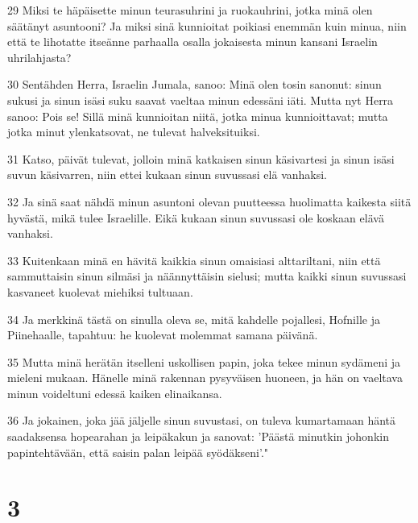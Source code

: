 \par 29 Miksi te häpäisette minun teurasuhrini ja ruokauhrini, jotka minä olen säätänyt asuntooni? Ja miksi sinä kunnioitat poikiasi enemmän kuin minua, niin että te lihotatte itseänne parhaalla osalla jokaisesta minun kansani Israelin uhrilahjasta?
\par 30 Sentähden Herra, Israelin Jumala, sanoo: Minä olen tosin sanonut: sinun sukusi ja sinun isäsi suku saavat vaeltaa minun edessäni iäti. Mutta nyt Herra sanoo: Pois se! Sillä minä kunnioitan niitä, jotka minua kunnioittavat; mutta jotka minut ylenkatsovat, ne tulevat halveksituiksi.
\par 31 Katso, päivät tulevat, jolloin minä katkaisen sinun käsivartesi ja sinun isäsi suvun käsivarren, niin ettei kukaan sinun suvussasi elä vanhaksi.
\par 32 Ja sinä saat nähdä minun asuntoni olevan puutteessa huolimatta kaikesta siitä hyvästä, mikä tulee Israelille. Eikä kukaan sinun suvussasi ole koskaan elävä vanhaksi.
\par 33 Kuitenkaan minä en hävitä kaikkia sinun omaisiasi alttariltani, niin että sammuttaisin sinun silmäsi ja näännyttäisin sielusi; mutta kaikki sinun suvussasi kasvaneet kuolevat miehiksi tultuaan.
\par 34 Ja merkkinä tästä on sinulla oleva se, mitä kahdelle pojallesi, Hofnille ja Piinehaalle, tapahtuu: he kuolevat molemmat samana päivänä.
\par 35 Mutta minä herätän itselleni uskollisen papin, joka tekee minun sydämeni ja mieleni mukaan. Hänelle minä rakennan pysyväisen huoneen, ja hän on vaeltava minun voideltuni edessä kaiken elinaikansa.
\par 36 Ja jokainen, joka jää jäljelle sinun suvustasi, on tuleva kumartamaan häntä saadaksensa hopearahan ja leipäkakun ja sanovat: 'Päästä minutkin johonkin papintehtävään, että saisin palan leipää syödäkseni'."

\chapter{3}

